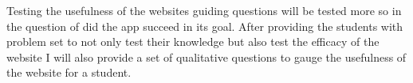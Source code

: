 \documentclass[10pt,twocolumn]{article}
\begin{document}
Testing the usefulness of the websites guiding questions will be tested more so in the question of did the app succeed in its goal. After providing the students with problem set to not only test their knowledge but also test the efficacy of the website I will also provide a set of qualitative questions to gauge the usefulness of the website for a student.



\begin{comment}
No definition citations, unless the term itself is in dispute
Separate problem background from technical background
    Unclear if games and apps require much technical background
    The general structure of the framework might be better suited for the Architecture Overview section
        Eg. Flask uses decorators to associate functions with URLs
        Eg. Unity has scripts associated with objects and specific triggers, such as walking into an area, pressing a button, etc.
    Maybe a better name is "algorithmic background"?
        Should explore what does and doesn't count
            All ML counts
            App and game frameworks do not
        Framework vs. library?
            I like the idea of [inversion of control](https://martinfowler.com/bliki/InversionOfControl.html), but that may be too abstract for students to understand
        Heuristic: is understanding that system necessary to understand the results?
            Ie. How Flask or Unity works doesn't influence whether the app/game is useful/fun/engaging
            But how (say) linear regression works is highly relevant for why the results match/don't match the actual values
\end{comment}

\printbibliography 
\end{document}
